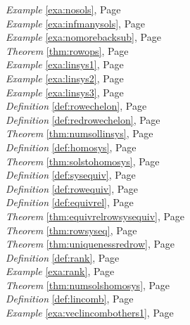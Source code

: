 \begin{multicols}{3}
\begin{center}
      \textit{Example} \ref{exa:nosols}, Page \pageref{exa:nosols} \\
      \textit{Example} \ref{exa:infmanysols}, Page \pageref{exa:infmanysols} \\
      \textit{Example} \ref{exa:nomorebacksub}, Page \pageref{exa:nomorebacksub} \\
      \textit{Theorem} \ref{thm:rowops}, Page \pageref{thm:rowops} \\
      \textit{Example} \ref{exa:linsys1}, Page \pageref{exa:linsys1} \\
      \textit{Example} \ref{exa:linsys2}, Page \pageref{exa:linsys2} \\
      \textit{Example} \ref{exa:linsys3}, Page \pageref{exa:linsys3} \\
      \textit{Definition} \ref{def:rowechelon}, Page \pageref{def:rowechelon} \\
      \textit{Definition} \ref{def:redrowechelon}, Page \pageref{def:redrowechelon} \\
      \textit{Theorem} \ref{thm:numsollinsys}, Page \pageref{thm:numsollinsys} \\
      \textit{Definition} \ref{def:homosys}, Page \pageref{def:homosys} \\
      \textit{Theorem} \ref{thm:solstohomosys}, Page \pageref{thm:solstohomosys} \\
      \textit{Definition} \ref{def:sysequiv}, Page \pageref{def:sysequiv} \\
      \textit{Definition} \ref{def:rowequiv}, Page \pageref{def:rowequiv} \\
      \textit{Definition} \ref{def:equivrel}, Page \pageref{def:equivrel} \\
      \textit{Theorem} \ref{thm:equivrelrowsysequiv}, Page \pageref{thm:equivrelrowsysequiv} \\
      \textit{Theorem} \ref{thm:rowsyseq}, Page \pageref{thm:rowsyseq} \\
      \textit{Theorem} \ref{thm:uniquenessredrow}, Page \pageref{thm:uniquenessredrow} \\
      \textit{Definition} \ref{def:rank}, Page \pageref{def:rank} \\
      \textit{Example} \ref{exa:rank}, Page \pageref{exa:rank} \\
      \textit{Theorem} \ref{thm:numsolshomosys}, Page \pageref{thm:numsolshomosys} \\
      \textit{Definition} \ref{def:lincomb}, Page \pageref{def:lincomb} \\
      \textit{Example} \ref{exa:veclincombothers1}, Page \pageref{exa:veclincombothers1} \\

\end{center}
\end{multicols}
